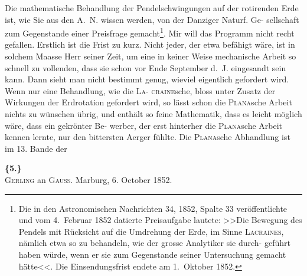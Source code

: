 \documentclass[12pt,a4paper]{article}
\theoremstyle{plain}
\theoremstyle{definition}
\theoremstyle{remark}
\begin{document}
Die mathematische Behandlung der Pendelschwingungen auf der rotirenden
Erde ist, wie Sie aus den A.~N. wissen werden, von der Danziger Naturf. Ge-
sellschaft zum Gegenstande einer Preisfrage gemacht\footnote{Die in den Astronomischen Nachrichten 34, 1852, Spalte 33 ver\"offentlichte und vom 4.~Februar 1852 datierte Preisaufgabe lautete: >>Die Bewegung des Pendels mit R\"ucksicht auf die Umdrehung
der Erde, im Sinne \textsc{Lacraines}, n\"amlich etwa so zu behandeln, wie der grosse Analytiker sie durch-
gef\"uhrt haben w\"urde, wenn er sie zum Gegenstande seiner Untersuchung gemacht h\"atte<<. Die Einsendungsfrist
endete am 1.~Oktober 1852.}. Mir will das Programm
nicht recht gefallen. Erstlich ist die Frist zu kurz. Nicht jeder, der etwa
bef\"ahigt w\"are, ist in solchem Maasse Herr seiner Zeit, um eine in keiner
Weise mechanische Arbeit so schnell zu vollenden, dass sie schon vor Ende
September d.~J. eingesandt sein kann. Dann sieht man nicht bestimmt genug,
wieviel eigentlich gefordert wird. Wenn nur eine Behandlung, wie die \textsc{La}-
\textsc{craine}sche, bloss unter Zusatz der Wirkungen der Erdrotation gefordert wird,
so l\"asst schon die \textsc{Plana}sche Arbeit nichts zu w\"unschen \"ubrig, und enth\"alt
so feine Mathematik, dass es leicht m\"oglich w\"are, dass ein gekr\"onter Be-
werber, der erst hinterher die \textsc{Plana}sche Arbeit kennen lernte, nur den
bittersten Aerger f\"uhlte. Die \textsc{Plana}sche Abhandlung ist im 13. Bande der

\vspace{0.5cm}

\noindent\textbf{\{5.\}}\\
\textsc{Gerling} an \textsc{Gauss}. Marburg, 6. October 1852.

\vspace{0.3cm}
\end{document}
